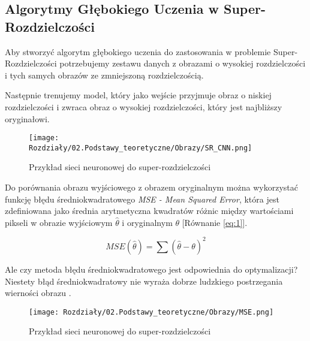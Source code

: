 

\subsection*{Algorytmy Głębokiego Uczenia w Super-Rozdzielczości}

Aby stworzyć algorytm głębokiego uczenia do zastosowania w problemie Super-Rozdzielczości potrzebujemy zestawu danych z obrazami o wysokiej rozdzielczości i tych samych obrazów ze zmniejszoną rozdzielczością.

Następnie trenujemy model, który jako wejście przyjmuje obraz o niskiej rozdzielczości i zwraca obraz o wysokiej rozdzielczości, który jest najbliższy oryginałowi.


\begin{figure}[h]
    \centering
    \texttt{[image: Rozdziały/02.Podstawy\_teoretyczne/Obrazy/SR\_CNN.png]}
    \caption{Przykład sieci neuronowej do super-rozdzielczości}
    \label{fig:image18}
\end{figure}



Do porównania obrazu wyjściowego z obrazem oryginalnym można wykorzystać funkcję błędu średniokwadratowego \textit{MSE - Mean Squared Error}, która jest zdefiniowana jako średnia arytmetyczna kwadratów różnic między wartościami pikseli w obrazie wyjściowym $\hat{\theta }$ i oryginalnym $\theta$ [Równanie \ref{eq:1}].

\begin{equation}
    MSE(\hat{\theta }) = \sum(\hat{\theta } - \theta )^2 \label{eq:1}
\end{equation}

Ale czy metoda błędu średniokwadratowego jest odpowiednia do optymalizacji?
Niestety błąd średniokwadratowy nie wyraża dobrze ludzkiego postrzegania wierności obrazu \cite{4775883}.

\begin{figure}[h]
    \centering
    \texttt{[image: Rozdziały/02.Podstawy\_teoretyczne/Obrazy/MSE.png]}
    \caption{Przykład sieci neuronowej do super-rozdzielczości}
    \label{fig:image56}
\end{figure}

